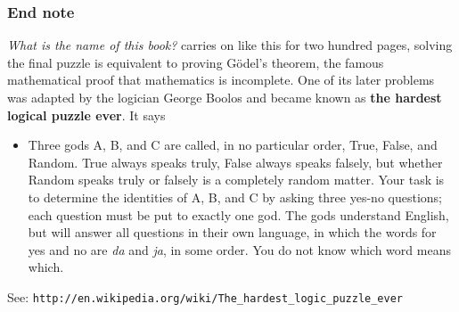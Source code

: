 \documentclass[12pt]{article}
\begin{document}
\subsubsection*{End note}
{\it What is the name of this book?} carries on like this for two hundred pages, solving the final puzzle is equivalent to proving G\"{o}del's theorem, the famous mathematical proof that mathematics is incomplete. One of its later problems was adapted by the logician George Boolos and became known as {\bf the hardest logical puzzle ever}. It says
\begin{itemize}
\item Three gods A, B, and C are called, in no particular order, True,
  False, and Random. True always speaks truly, False always speaks
  falsely, but whether Random speaks truly or falsely is a completely
  random matter. Your task is to determine the identities of A, B, and
  C by asking three yes-no questions; each question must be put to
  exactly one god. The gods understand English, but will answer all
  questions in their own language, in which the words for yes and no
  are {\sl da} and {\sl ja}, in some order. You do not know which word means
  which.
\end{itemize}
See: {\tt http://en.wikipedia.org/wiki/The\_hardest\_logic\_puzzle\_ever}
\end{document}
